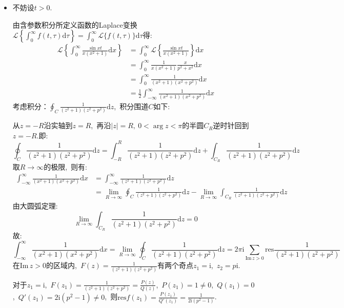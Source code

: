 \documentclass[a4paper,fontset=windows]{ctexart}
\begin{document}
\begin{itemize}
\smallskip
\item[6.(3)]
不妨设$t>0$.

由含参数积分所定义函数的Laplace变换$\mathscr{L}\left\lbrace\int_{0}^{\infty}f(t,\tau)\mathrm{d}\tau\right\rbrace=\int_{0}^{\infty}\mathscr{L}\{f(t,\tau)\}\mathrm{d}\tau$得:
\begin{align*}
\mathscr{L}\left\lbrace\int_{0}^{\infty}\frac{\sin xt}{x\left(x^2+1\right)}\mathrm{d}x\right\rbrace
&=\int_{0}^{\infty}\mathscr{L}\left\lbrace\frac{\sin xt}{x\left(x^2+1\right)}\right\rbrace\mathrm{d}x \\
&=\int_{0}^{\infty}\frac{1}{x\left(x^2+1\right)}\frac{x}{p^2+x^2}\mathrm{d}x \\
&=\int_{0}^{\infty}\frac{1}{\left(x^2+1\right)\left(x^2+p^2\right)}\mathrm{d}x \\
&=\frac{1}{2}\int_{-\infty}^{\infty}\frac{1}{\left(x^2+1\right)\left(x^2+p^2\right)}\mathrm{d}x
\end{align*}
考虑积分：$\oint_{C}\frac{1}{\left(z^2+1\right)\left(z^2+p^2\right)}\mathrm{d}z$,\ 积分围道$C$如下:

从$z=-R$沿实轴到$z=R$,\ 再沿$|z|=R,\ 0<\arg z<\pi$的半圆$C_R$逆时针回到$z=-R$.即:
\[
\oint_{C}\frac{1}{\left(z^2+1\right)\left(z^2+p^2\right)}\mathrm{d}z
=\int_{-R}^{R}\frac{1}{\left(z^2+1\right)\left(z^2+p^2\right)}\mathrm{d}z+\int_{C_R}\frac{1}{\left(z^2+1\right)\left(z^2+p^2\right)}\mathrm{d}z
\]
取$R\rightarrow\infty$的极限,\ 则有:
\begin{align*}
\int_{-\infty}^{\infty}\frac{1}{\left(x^2+1\right)\left(x^2+p^2\right)}\mathrm{d}x
&=\int_{-\infty}^{\infty}\frac{1}{\left(z^2+1\right)\left(z^2+p^2\right)}\mathrm{d}z \\
&=\lim_{R \to \infty}\oint_{C}\frac{1}{\left(z^2+1\right)\left(z^2+p^2\right)}\mathrm{d}z-\lim_{R \to \infty}\int_{C_R}\frac{1}{\left(z^2+1\right)\left(z^2+p^2\right)}\mathrm{d}z
\end{align*}
由大圆弧定理:
\[
\lim_{R \to \infty}\int_{C_R}\frac{1}{\left(z^2+1\right)\left(z^2+p^2\right)}\mathrm{d}z=0
\]
故:
\[
\int_{-\infty}^{\infty}\frac{1}{\left(x^2+1\right)\left(x^2+p^2\right)}\mathrm{d}x
=\lim_{R \to \infty}\oint_{C}\frac{1}{\left(z^2+1\right)\left(z^2+p^2\right)}\mathrm{d}z
=2\pi\mathrm{i}\sum_{\mathrm{Im}\,z>0}\mathrm{res}\frac{1}{\left(z^2+1\right)\left(z^2+p^2\right)}
\]
在$\mathrm{Im}\,z>0$的区域内,\ $F(z)=\frac{1}{\left(z^2+1\right)\left(z^2+p^2\right)}$有两个奇点$z_1=\mathrm{i}$,\ $z_2=p\mathrm{i}$.

对于$z_1=\mathrm{i}$,\ $F(z_1)=\frac{1}{\left(z^2+1\right)\left(z^2+p^2\right)}=\frac{P(z)}{Q(z)}$,\ $P(z_1)=1\neq0$,\ $Q(z_1)=0$,\ $Q'(z_1)=2\mathrm{i}(p^2-1)\neq0$,\ 则$\mathrm{res}f(z_1)=\frac{P(z_1)}{Q'(z_1)}=\frac{1}{2\mathrm{i}(p^2-1)}$.


\end{itemize}
\end{document}
